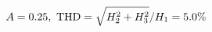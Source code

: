 \documentclass[preview]{standalone}
\begin{document}
\begin{align*}
\special{dvisvgm:raw <g id='unique000'>}A=0.25,\ \text{THD}=\sqrt{H_2^2+H_3^2}/H_1=5.0\%\special{dvisvgm:raw </g>}
\end{align*}
\end{document}
